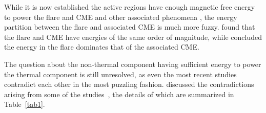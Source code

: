 
While it is now established the active regions have enough magnetic free energy to power the flare and CME and other associated phenomena  \citep{emslie12,ash17}, the energy partition between the flare and associated CME is much more fuzzy. \cite{emslie12} found that the flare and CME have energies of the same order of magnitude, while \cite{ash17} concluded the energy in the flare dominates that of the associated CME. 

The question about the non-thermal component having sufficient energy to power the thermal component is still unresolved, as even the most recent studies contradict each other in the most puzzling fashion. \cite{warmuth20} discussed the contradictions arising from some of the studies~\citep{stosire07,emslie12,inglis14,warmuth16a,warmuth16b,ash17}, the details of which are summarized in Table~\ref{tab1}.

\begin{table}[ht!]
    \centering
    \caption{Observational summary of the flares as described in \cite{warmuth20}.}
    \label{tab1}
\end{table}

